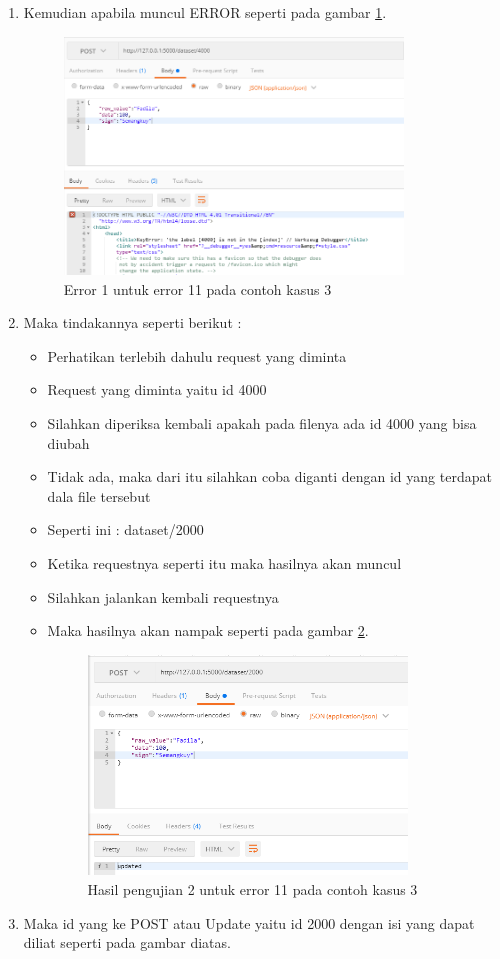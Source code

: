 \begin{enumerate}
\item Kemudian apabila muncul ERROR seperti pada gambar \ref{fig:err11}.
\begin{figure}[!htbp]
	\centerline{\includegraphics[width=0.85\textwidth]{figures/10/err11.PNG}}
	\caption{Error 1 untuk error 11 pada contoh kasus 3}
	\label{fig:err11}
\end{figure}

\item Maka tindakannya seperti berikut :
\begin{itemize}
\item Perhatikan terlebih dahulu request yang diminta
\item Request yang diminta yaitu id 4000
\item Silahkan diperiksa kembali apakah pada filenya ada id 4000 yang bisa diubah
\item Tidak ada, maka dari itu silahkan coba  diganti dengan id yang terdapat dala file tersebut
\item Seperti ini : dataset/2000
\item Ketika requestnya seperti itu maka hasilnya akan muncul
\item Silahkan jalankan kembali requestnya
\item Maka hasilnya akan nampak seperti pada gambar \ref{fig:hu21}.
\begin{figure}[!htbp]
	\centerline{\includegraphics[width=0.85\textwidth]{figures/10/hu21.PNG}}
	\caption{Hasil pengujian 2 untuk error 11 pada contoh kasus 3}
	\label{fig:hu21}
\end{figure}
\end{itemize}

\item Maka id yang ke POST atau Update yaitu id 2000 dengan isi yang dapat diliat seperti pada gambar diatas.
\end{enumerate}